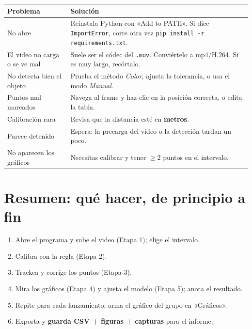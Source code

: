 \documentclass[11pt,a4paper]{article}
\begin{document}
\begin{table}[htbp]
  \centering
  \begin{tabular}{@{}p{5.2cm} p{8.3cm}@{}}
    \toprule
    \textbf{Problema} & \textbf{Solución} \\
    \midrule
    No abre & Reinstala Python con «Add to PATH». Si dice
      \texttt{ImportError}, corre otra vez \texttt{pip install -r requirements.txt}. \\
    El video no carga o se ve mal & Suele ser el códec del \texttt{.mov}.
      Conviértelo a mp4/H.264. Si es muy largo, recórtalo. \\
    No detecta bien el objeto & Prueba el método \emph{Color}, ajusta la
      tolerancia, o usa el modo \emph{Manual}. \\
    Puntos mal marcados & Navega al frame y haz clic en la posición correcta, o
      edita la tabla. \\
    Calibración rara & Revisa que la distancia esté en \textbf{metros}. \\
    Parece detenido & Espera: la precarga del video o la detección tardan un poco. \\
    No aparecen los gráficos & Necesitas calibrar y tener $\geq 2$ puntos en el
      intervalo. \\
    \bottomrule
  \end{tabular}
\end{table}

\section{Resumen: qué hacer, de principio a fin}

\begin{resumen}
  \begin{enumerate}
    \item Abre el programa y sube el video (Etapa 1); elige el intervalo.
    \item Calibra con la regla (Etapa 2).
    \item Trackea y corrige los puntos (Etapa 3).
    \item Mira los gráficos (Etapa 4) y ajusta el modelo (Etapa 5); anota el
      resultado.
    \item Repite para cada lanzamiento; arma el gráfico del grupo en «Gráficos».
    \item Exporta y \textbf{guarda CSV + figuras + capturas} para el informe.
  \end{enumerate}
\end{resumen}
\end{document}
